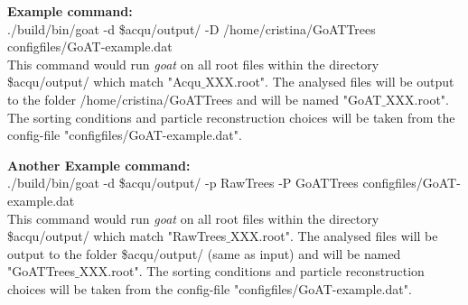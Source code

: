 \documentclass[12pt]{article}
\begin{document}
\noindent \textbf{Example command:} \\
./build/bin/goat -d \$acqu/output/ -D /home/cristina/GoATTrees configfiles/GoAT-example.dat \\

\noindent This command would run \textit{goat} on all root files within the directory \$acqu/output/ which match "Acqu$\_$XXX.root". The analysed files will be output to the folder /home/cristina/GoATTrees and will be named "GoAT$\_$XXX.root". The sorting conditions and particle reconstruction choices will be taken from the config-file "configfiles/GoAT-example.dat". \\
\vspace{10mm}

\noindent \textbf{Another Example command:} \\
./build/bin/goat -d \$acqu/output/ -p RawTrees -P GoATTrees configfiles/GoAT-example.dat \\

\noindent This command would run \textit{goat} on all root files within the directory \$acqu/output/ which match "RawTrees$\_$XXX.root". The analysed files will be output to the folder \$acqu/output/ (same as input) and will be named "GoATTrees$\_$XXX.root". The sorting conditions and particle reconstruction choices will be taken from the config-file "configfiles/GoAT-example.dat".
\end{document}
